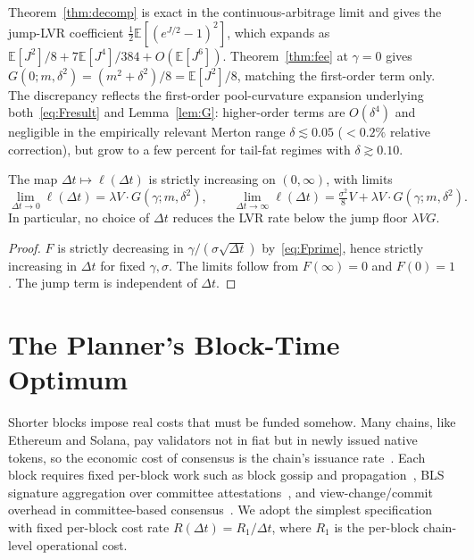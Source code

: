 \documentclass[runningheads]{llncs}
\newcommand{\E}{\mathbb{E}}
\newcommand{\dt}{\Delta t}
\newcommand{\1}{\mathbf{1}}
\begin{document}
\begin{remark}\label{rem:limit}
Theorem~\ref{thm:decomp} is exact in the continuous-arbitrage limit and gives the jump-LVR coefficient $\tfrac{1}{2}\E[(e^{J/2}-1)^2]$, which expands as $\E[J^2]/8 + 7\E[J^4]/384 + O(\E[J^6])$. Theorem~\ref{thm:fee} at $\gamma = 0$ gives $G(0;m,\delta^2) = (m^2+\delta^2)/8 = \E[J^2]/8$, matching the first-order term only. The discrepancy reflects the first-order pool-curvature expansion underlying both~\eqref{eq:Fresult} and Lemma~\ref{lem:G}: higher-order terms are $O(\delta^4)$ and negligible in the empirically relevant Merton range $\delta \lesssim 0.05$ ($<0.2\%$ relative correction), but grow to a few percent for tail-fat regimes with $\delta \gtrsim 0.10$.
\end{remark}

\begin{corollary}\label{cor:floor}
The map $\dt \mapsto \ell(\dt)$ is strictly increasing on $(0,\infty)$, with limits
\[
\lim_{\dt\to 0} \ell(\dt) = \lambda V \cdot G(\gamma; m, \delta^2), \qquad
\lim_{\dt\to\infty} \ell(\dt) = \tfrac{\sigma^2}{8}V + \lambda V \cdot G(\gamma; m, \delta^2).
\]
In particular, no choice of $\dt$ reduces the LVR rate below the jump floor $\lambda V G$.
\end{corollary}

\begin{proof}
$F$ is strictly decreasing in $\gamma/(\sigma\sqrt{\dt})$ by~\eqref{eq:Fprime}, hence strictly increasing in $\dt$ for fixed $\gamma, \sigma$. The limits follow from $F(\infty) = 0$ and $F(0)=1$. The jump term is independent of $\dt$.
\end{proof}

\section{The Planner's Block-Time Optimum}\label{sec:opt}

Shorter blocks impose real costs that must be funded somehow. Many chains, like Ethereum and Solana, pay validators not in fiat but in newly issued native tokens, so the economic cost of consensus is the chain's issuance rate~\cite{buterin2023paths,beccuti2025staking}. Each block requires fixed per-block work such as block gossip and propagation~\cite{decker2013information}, BLS signature aggregation over committee attestations~\cite{buterin2023paths}, and view-change/commit overhead in committee-based consensus~\cite{benhaim2024scaling}. We adopt the simplest specification with fixed per-block cost rate $R(\dt) = R_1/\dt$, where $R_1$ is the per-block chain-level operational cost.
\end{document}
